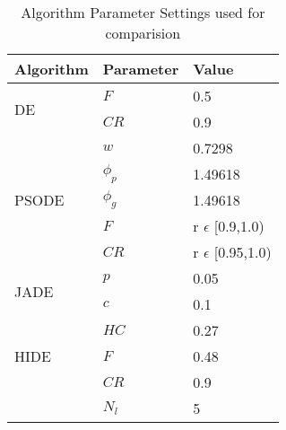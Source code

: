 

\begin{table}[b]
\centering
\caption{Algorithm Parameter Settings used for comparision}
\label{table:params}
\begin{tabular}{|l|l|l|}
\hline
Algorithm & Parameter & Value \\
\hline
\multirow{2}{*}{DE} & $F$ & 0.5 \\ \cline{2-3} 
                  & $CR$ & 0.9 \\ \hline
\multirow{5}{*}{PSODE} & $w$ & 0.7298 \\ \cline{2-3} 
                  & $\phi_p$ & 1.49618 \\ \cline{2-3} 
                  & $\phi_g$ & 1.49618 \\ \cline{2-3} 
                  & $F$ & r $\epsilon$ [0.9,1.0)  \\ \cline{2-3} 
                  & $CR$ & r $\epsilon$ [0.95,1.0) \\ \hline
\multirow{2}{*}{JADE} & $p$ & 0.05 \\ \cline{2-3} 
                  & $c$ & 0.1 \\ \hline
\multirow{3}{*}{HIDE} & $HC$ & 0.27 \\ \cline{2-3}
				& $F$ & 0.48 \\ \cline{2-3}
				& $CR$ & 0.9 \\ \cline{2-3}
                  & $N_{l}$ & 5 \\ \hline
\end{tabular}
\end{table}